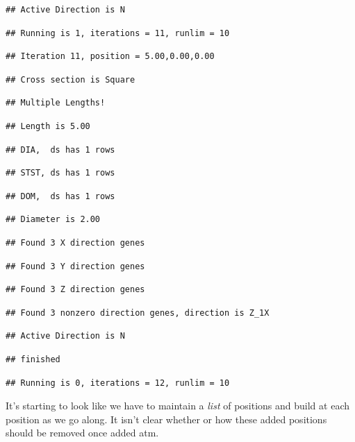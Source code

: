 \documentclass[]{article}
\begin{document}
\begin{verbatim}
## Active Direction is N
\end{verbatim}

\begin{verbatim}
## Running is 1, iterations = 11, runlim = 10
\end{verbatim}

\begin{verbatim}
## Iteration 11, position = 5.00,0.00,0.00
\end{verbatim}

\begin{verbatim}
## Cross section is Square
\end{verbatim}

\begin{verbatim}
## Multiple Lengths!
\end{verbatim}

\begin{verbatim}
## Length is 5.00
\end{verbatim}

\begin{verbatim}
## DIA,  ds has 1 rows
\end{verbatim}

\begin{verbatim}
## STST, ds has 1 rows
\end{verbatim}

\begin{verbatim}
## DOM,  ds has 1 rows
\end{verbatim}

\begin{verbatim}
## Diameter is 2.00
\end{verbatim}

\begin{verbatim}
## Found 3 X direction genes
\end{verbatim}

\begin{verbatim}
## Found 3 Y direction genes
\end{verbatim}

\begin{verbatim}
## Found 3 Z direction genes
\end{verbatim}

\begin{verbatim}
## Found 3 nonzero direction genes, direction is Z_1X
\end{verbatim}

\begin{verbatim}
## Active Direction is N
\end{verbatim}

\begin{verbatim}
## finished
\end{verbatim}

\begin{verbatim}
## Running is 0, iterations = 12, runlim = 10
\end{verbatim}

It's starting to look like we have to maintain a \emph{list} of
positions and build at each position as we go along. It isn't clear
whether or how these added positions should be removed once added atm.
\end{document}
